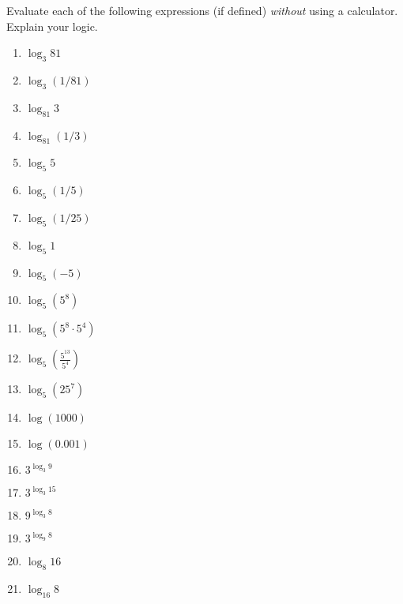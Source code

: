 \documentclass{ximera}
\begin{document}
\begin{question}  \label{Qdr435rtgfg}
Evaluate each of the following expressions (if defined) \emph{without} using a calculator. Explain your logic.
\begin{enumerate}
\item $\log_3 81$

\item $\log_3 (1/81)$

\item $\log_{81}3$

\item $\log_{81} (1/3)$

\item $\log_5 5$

\item $\log_5 (1/5)$

\item $\log_5 (1/25)$

\item $\log_5 1$

\item $\log_5(-5)$

\item $\log_5 (5^8)$

\item $\log_5(5^8 \cdot 5^4)$

\item $\log_5\left(  \frac{5^{13}}{5^{4}} \right)$

\item $\log_5(25^7)$

\item $\log (1000)$

\item $\log (0.001)$

\item $3^{\log_3 9}$

\item $3^{\log_3 15}$

\item $9^{\log_3 8}$

\item $3^{\log_9 8}$

\item $\log_8 16$

\item $\log_{16}8$

\end{enumerate}
\end{question}
\end{document}
